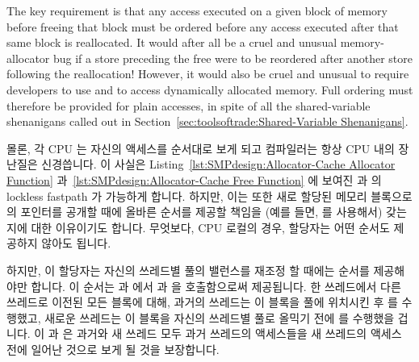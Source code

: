 The key requirement is that any access executed on a given block of
memory before freeing that block must be ordered before any access
executed after that same block is reallocated.
It would after all be a cruel and unusual memory-allocator bug if a store
preceding the free were to be reordered after another store following
the reallocation!
However, it would also be cruel and unusual to require developers to use
 and  to access dynamically allocated
memory.
Full ordering must therefore be provided for plain accesses, in spite of
all the shared-variable shenanigans called out in
Section~\ref{sec:toolsoftrade:Shared-Variable Shenanigans}.
\fi

몰론, 각 CPU 는 자신의 액세스를 순서대로 보게 되고 컴파일러는 항상 CPU 내의
장난질은 신경씁니다.
이 사실은
Listing~\ref{lst:SMPdesign:Allocator-Cache Allocator Function}
과~\ref{lst:SMPdesign:Allocator-Cache Free Function} 에 보여진
 과  의 lockless fastpath 가 가능하게
합니다.
하지만, 이는 또한 새로 할당된 메모리 블록으로의 포인터를 공개할 때에 올바른
순서를 제공할 책임을 (예를 들면,  를 사용해서) 갖는지에
대한 이유이기도 합니다.
무엇보다, CPU 로컬의 경우, 할당자는 어떤 순서도 제공하지 않아도 됩니다.

하지만, 이 할당자는 자신의 쓰레드별 풀의 밸런스를 재조정 할 때에는 순서를
제공해야만 합니다.
이 순서는  과  에서 
과  을 호출함으로써 제공됩니다.
한 쓰레드에서 다른 쓰레드로 이전된 모든 블록에 대해, 과거의 쓰레드는 이 블록을
 풀에 위치시킨 후  를 수행했고,
새로운 쓰레드는 이 블록을 자신의 쓰레드별 풀로 올믹기 전에
 를 수행했을 겁니다.
이  과  은 과거와 새 쓰레드 모두 과거
쓰레드의 액세스들을 새 쓰레드의 액세스 전에 일어난 것으로 보게 될 것을
보장합니다.
\iffalse


